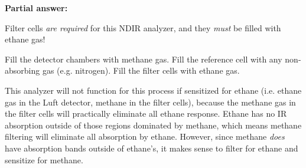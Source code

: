 





\noindent
{\bf Partial answer:}

\vskip 10pt

Filter cells {\it are required} for this NDIR analyzer, and they {\it must} be filled with ethane gas!







Fill the detector chambers with methane gas.  Fill the reference cell with any non-absorbing gas (e.g. nitrogen).  Fill the filter cells with ethane gas.

\vskip 10pt

This analyzer will not function for this process if sensitized for ethane (i.e. ethane gas in the Luft detector, methane in the filter cells), because the methane gas in the filter cells will practically eliminate all ethane response.  Ethane has no IR absorption outside of those regions dominated by methane, which means methane filtering will eliminate all absorption by ethane.  However, since methane {\it does} have absorption bands outside of ethane's, it makes sense to filter for ethane and sensitize for methane.




